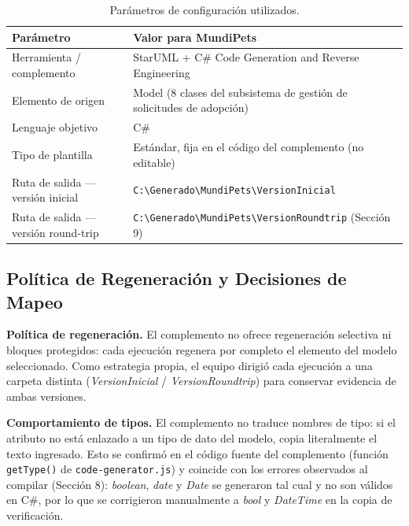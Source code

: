 \documentclass[journal,onecolumn]{IEEEtran}
\begin{document}
\begin{table}[h]
	\centering
	\caption{Parámetros de configuración utilizados.}
	\label{tab:parametros_config}
	\begin{tabular}{|p{4.5cm}|p{8cm}|}
		\hline
		\textbf{Parámetro} & \textbf{Valor para MundiPets} \\
		\hline
		Herramienta / complemento & StarUML + C\# Code Generation and Reverse Engineering \\
		\hline
		Elemento de origen & Model (8 clases del subsistema de gestión de solicitudes de adopción) \\
		\hline
		Lenguaje objetivo & C\# \\
		\hline
		Tipo de plantilla & Estándar, fija en el código del complemento (no editable) \\
		\hline
		Ruta de salida --- versión inicial & \texttt{C:\textbackslash Generado\textbackslash MundiPets\textbackslash VersionInicial} \\
		\hline
		Ruta de salida --- versión round-trip & \texttt{C:\textbackslash Generado\textbackslash MundiPets\textbackslash VersionRoundtrip} (Sección 9) \\
		\hline
	\end{tabular}
\end{table}

\subsection{Política de Regeneración y Decisiones de Mapeo}

\textbf{Política de regeneración.} El complemento no ofrece regeneración selectiva ni bloques protegidos: cada ejecución regenera por completo el elemento del modelo seleccionado. Como estrategia propia, el equipo dirigió cada ejecución a una carpeta distinta (\textit{VersionInicial} / \textit{VersionRoundtrip}) para conservar evidencia de ambas versiones.

\textbf{Comportamiento de tipos.} El complemento no traduce nombres de tipo: si el atributo no está enlazado a un tipo de dato del modelo, copia literalmente el texto ingresado. Esto se confirmó en el código fuente del complemento (función \texttt{getType()} de \texttt{code-generator.js}) y coincide con los errores observados al compilar (Sección 8): \textit{boolean}, \textit{date} y \textit{Date} se generaron tal cual y no son válidos en C\#, por lo que se corrigieron manualmente a \textit{bool} y \textit{DateTime} en la copia de verificación.
\end{document}
